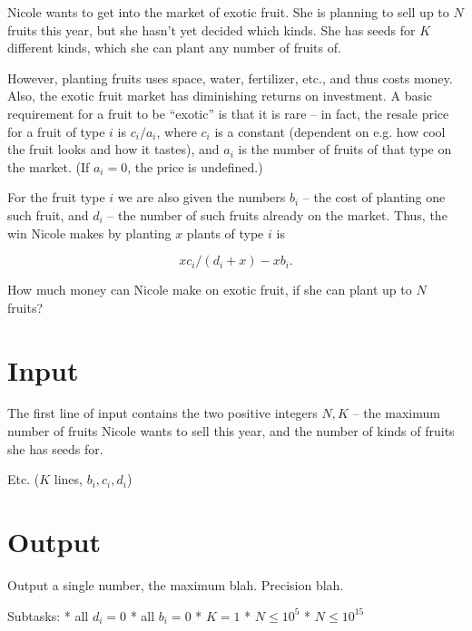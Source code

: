 Nicole wants to get into the market of exotic fruit.
She is planning to sell up to $N$ fruits this year, but she hasn't yet decided which kinds.
She has seeds for $K$ different kinds, which she can plant any number of fruits of.

However, planting fruits uses space, water, fertilizer, etc., and thus costs money.
Also, the exotic fruit market has diminishing returns on investment.
A basic requirement for a fruit to be ``exotic'' is that it is rare -- in fact, the
resale price for a fruit of type $i$ is $c_i / a_i$, where $c_i$ is a constant
(dependent on e.g. how cool the fruit looks and how it tastes), and $a_i$ is the number
of fruits of that type on the market. (If $a_i = 0$, the price is undefined.)

For the fruit type $i$ we are also given the numbers $b_i$ -- the cost of planting one
such fruit, and $d_i$ -- the number of such fruits already on the market.
Thus, the win Nicole makes by planting $x$ plants of type $i$ is

\[ x c_i / (d_i + x) - x b_i. \]

How much money can Nicole make on exotic fruit, if she can plant up to $N$ fruits?

\section*{Input}
The first line of input contains the two positive integers $N, K$ -- the maximum number of fruits
Nicole wants to sell this year, and the number of kinds of fruits she has seeds for.

Etc. ($K$ lines, $b_i, c_i, d_i$)

\section*{Output}
Output a single number, the maximum blah. Precision blah.

Subtasks:
* all $d_i = 0$
* all $b_i = 0$
* $K = 1$
* $N \le 10^5$
* $N \le 10^{15}$
